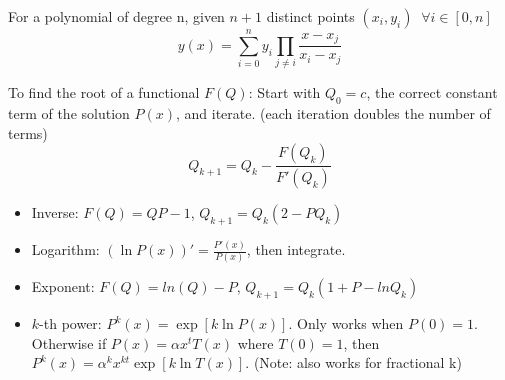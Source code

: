  For a polynomial of degree n, given $n+1$ distinct points $(x_i, y_i) \;\; \forall i \in [0, n]$
$$ y(x) = \sum_{i=0}^{n} y_i \prod_{j \ne i} \frac{x - x_j}{x_i - x_j} $$

 To find the root of a functional $F(Q)$: Start with $Q_0 = c$, the correct constant term of the solution $P(x)$, and iterate. (each iteration doubles the number of terms)
$$ Q_{k+1} = Q_k - \frac{F(Q_k)}{F'(Q_k)} $$

\begin{itemize}
  \item Inverse: $F(Q) = QP - 1$, $Q_{k+1} = Q_k(2 - PQ_k)$
  \item Logarithm: $(\ln P(x))' = \frac{P'(x)}{P(x)}$, then integrate.
  \item Exponent: $F(Q) = ln(Q) - P$, $Q_{k+1} = Q_k(1 + P - ln Q_k)$
  \item $k$-th power: $P^k(x) = \exp[k \ln P(x)]$.
  Only works when $P(0) = 1$. Otherwise if $P(x) = \alpha x^t T(x)$ where $T(0) = 1$, then \\
  $P^k(x) = \alpha^k x^{kt} \exp[k \ln T(x)]$. (Note: also works for fractional k)
\end{itemize}
